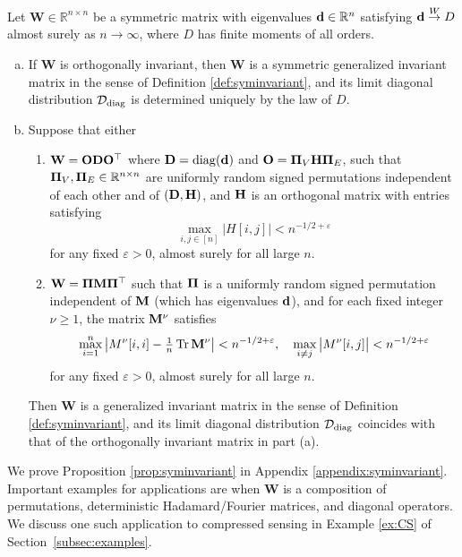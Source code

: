 \documentclass[10pt,reqno]{amsart}
\def\W{\mathbf{W}}
\def\R{\mathbb{R}}
\def\diag{\operatorname{diag}}
\def\toW{\overset{W}{\to}}
\def\eps{\varepsilon}
\def\Tr{\operatorname{Tr}}
\newcommand{\tdiag}{\mathrm{diag}}
\begin{document}
\begin{proposition}\label{prop:syminvariant}
Let $\W \in \R^{n \times n}$ be a symmetric matrix with eigenvalues
$\bd \in \R^n$ satisfying $\bd \toW D$ almost surely as $n \to \infty$,
where $D$ has finite moments of all orders.
\begin{enumerate}[(a)]
\item If $\W$ is orthogonally invariant, then $\W$ is a symmetric generalized
invariant matrix in the sense of Definition \ref{def:syminvariant}, and
its limit diagonal distribution $\cD_\tdiag$ is determined uniquely by the law
of $D$.
\item Suppose that either
\begin{enumerate}[1.]
\item $\W=\bO\bD\bO^\top$ where $\bD=\diag(\bd)$ and
$\mathbf{O}=\bm{\Pi}_V\mathbf{H}\bm{\Pi}_E$, such that
$\bPi_V,\bPi_E \in \R^{n \times n}$ are uniformly random signed permutations
independent of each other and of $(\mathbf{D},\mathbf{H})$, and $\mathbf{H}$ is an orthogonal matrix
with entries satisfying
\begin{equation}\label{eq:symdelocalization}
\max_{i,j \in [n]} |H[i,j]|<n^{-1/2+\eps}
\end{equation}
for any fixed $\eps>0$, almost surely for all large $n$.
\item $\W=\bPi\bM\bPi^\top$ such that $\bm{\Pi}$ is a
uniformly random signed permutation independent of $\mathbf{M}$ (which has
eigenvalues $\mathbf{d}$),
and for each fixed integer $\nu \geq 1$, the matrix $\mathbf{M}^\nu$ satisfies
\begin{equation}\label{eq:Mcondition}
\max_{i=1}^n \big|M^\nu[i,i] - \tfrac{1}{n}\Tr \bM^\nu \big| <
n^{-1/2+\eps},
\quad \max_{i\neq j} \big|M^\nu[i,j]\big| < n^{-1/2+\eps}
\end{equation}
for any fixed $\eps>0$, almost surely for all large $n$.
\end{enumerate}
Then $\W$ is a generalized invariant matrix in the sense of Definition
\ref{def:syminvariant}, and its limit diagonal distribution $\cD_\tdiag$ coincides
with that of the orthogonally invariant matrix in part (a).
\end{enumerate}
\end{proposition}

We prove Proposition \ref{prop:syminvariant} in Appendix
\ref{appendix:syminvariant}.
Important examples for applications are when $\W$ is
a composition of permutations, deterministic Hadamard/Fourier
matrices, and diagonal operators.
We discuss one such application to compressed sensing in Example \ref{ex:CS} of 
Section~\ref{subsec:examples}.
\end{document}
